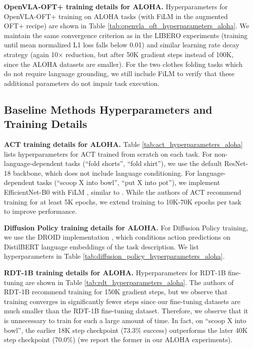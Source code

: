 \documentclass[conference]{IEEEtran}
\begin{document}
\textbf{OpenVLA-OFT+ training details for ALOHA.} Hyperparameters for OpenVLA-OFT+ training on ALOHA tasks (with FiLM in the augmented OFT+ recipe) are shown in Table \ref{tab:openvla_oft_hyperparameters_aloha}. We maintain the same convergence criterion as in the LIBERO experiments (training until mean normalized L1 loss falls below 0.01) and similar learning rate decay strategy (again 10$\times$ reduction, but after 50K gradient steps instead of 100K, since the ALOHA datasets are smaller). For the two clothes folding tasks which do not require language grounding, we still include FiLM to verify that these additional parameters do not impair task execution.


\subsection{Baseline Methods Hyperparameters and Training Details}
\label{app:baseline_training_details}

\textbf{ACT training details for ALOHA.} Table \ref{tab:act_hyperparameters_aloha} lists hyperparameters for ACT \citep{zhao2023learning} trained from scratch on each task. For non-language-dependent tasks (``fold shorts'', ``fold shirt''), we use the default ResNet-18 \citep{he2016deep} backbone, which does not include language conditioning. For language-dependent tasks (``scoop X into bowl'', ``put X into pot''), we implement EfficientNet-B0 \citep{tan2019efficientnet} with FiLM \citep{perez2018film}, similar to \citep{shi2024yell}. While the authors of ACT recommend training for at least 5K epochs, we extend training to 10K-70K epochs per task to improve performance.

\textbf{Diffusion Policy training details for ALOHA.} For Diffusion Policy training, we use the DROID implementation \citep{khazatsky2024droid}, which conditions action predictions on DistilBERT \citep{sanh2019distilbert} language embeddings of the task description. We list hyperparameters in Table \ref{tab:diffusion_policy_hyperparameters_aloha}.

\textbf{RDT-1B training details for ALOHA.} Hyperparameters for RDT-1B fine-tuning are shown in Table \ref{tab:rdt_hyperparameters_aloha}. The authors of RDT-1B recommend training for 150K gradient steps, but we observe that training converges in significantly fewer steps since our fine-tuning datasets are much smaller than the RDT-1B fine-tuning dataset. Therefore, we observe that it is unnecessary to train for such a large amount of time. In fact, on ``scoop X into bowl'', the earlier 18K step checkpoint (73.3\% success) outperforms the later 40K step checkpoint (70.0\%) (we report the former in our ALOHA experiments).
\end{document}
